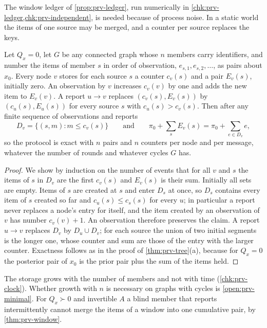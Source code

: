 The window ledger of \cref{prop:prv-ledger}, run numerically in \cref{chk:prv-ledger,chk:prv-independent}, is needed because of process noise. In a static world the items of one source may be merged, and a counter per source replaces the keys.

\begin{proposition}\label{prop:prv-clock}
Let $Q_x=0$, let $G$ be any connected graph whose $n$ members carry identifiers, and number the items of member $s$ in order of observation, $e_{s,1},e_{s,2},\dots$, as pairs about $x_0$. Every node $v$ stores for each source $s$ a counter $c_v(s)$ and a pair $E_v(s)$, initially zero. An observation by $v$ increases $c_v(v)$ by one and adds the new item to $E_v(v)$. A report $u\to v$ replaces $(c_v(s),E_v(s))$ by $(c_u(s),E_u(s))$ for every source $s$ with $c_u(s)>c_v(s)$. Then after any finite sequence of observations and reports
\[
D_v=\{(s,m):m\le c_v(s)\}\qquad\text{and}\qquad\pi_0+\sum_sE_v(s)=\pi_0+\sum_{e\in D_v}e,
\]
so the protocol is exact with $n$ pairs and $n$ counters per node and per message, whatever the number of rounds and whatever cycles $G$ has.
\end{proposition}

\begin{proof}
We show by induction on the number of events that for all $v$ and $s$ the items of $s$ in $D_v$ are the first $c_v(s)$ and $E_v(s)$ is their sum. Initially all sets are empty. Items of $s$ are created at $s$ and enter $D_s$ at once, so $D_s$ contains every item of $s$ created so far and $c_u(s)\le c_s(s)$ for every $u$; in particular a report never replaces a node's entry for itself, and the item created by an observation of $v$ has number $c_v(v)+1$. An observation therefore preserves the claim. A report $u\to v$ replaces $D_v$ by $D_u\cup D_v$; for each source the union of two initial segments is the longer one, whose counter and sum are those of the entry with the larger counter. Exactness follows as in the proof of \cref{thm:prv-tree}(a), because for $Q_x=0$ the posterior pair of $x_0$ is the prior pair plus the sum of the items held.
\end{proof}

The storage grows with the number of members and not with time (\cref{chk:prv-clock}). Whether growth with $n$ is necessary on graphs with cycles is \cref{open:prv-minimal}. For $Q_x\succ0$ and invertible $A$ a blind member that reports intermittently cannot merge the items of a window into one cumulative pair, by \cref{thm:prv-window}.

